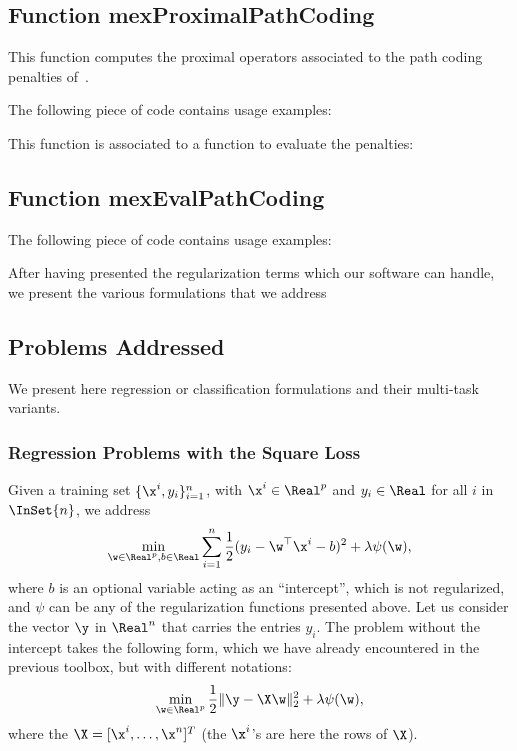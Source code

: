 \documentclass[a4paper, 11pt]{article}
\begin{document}
\subsection{Function mexProximalPathCoding}
This function computes the proximal operators associated to the path coding penalties of~\cite{mairal14}. 

The following piece of code contains usage examples:

This function is associated to a function to evaluate the penalties:
\subsection{Function mexEvalPathCoding}

The following piece of code contains usage examples:



After having presented the regularization terms which our software can handle,
we present the various formulations that we address
\subsection{Problems Addressed}
We present here regression or classification formulations and their multi-task variants.
\subsubsection{Regression Problems with the Square Loss}  %
Given a training set $\{\x^i,y_i\}_{i=1}^n$, with $\x^i \in \Real^p$ and $y_i \in \Real$ for all $i$ in $\InSet{n}$, we address
\begin{displaymath}
\min_{\w \in \Real^p, b \in \Real} \sum_{i=1}^n \frac{1}{2}(y_i-\w^\top\x^i-b)^2 + \lambda\psi(\w),
\end{displaymath}
where $b$ is an optional variable acting as an ``intercept'', which is not regularized, and $\psi$
can be any of the regularization functions presented above. 
Let us consider the vector $\y$ in $\Real^n$ that carries the entries $y_i$. 
The problem without the intercept takes the following form, which we have already
encountered in the previous toolbox, but with different notations:
\begin{displaymath}
\min_{\w \in \Real^p} \frac{1}{2}\|\y-\X\w\|_2^2 + \lambda\psi(\w),
   \end{displaymath}
   where the $\X=[\x^i,\ldots,\x^n]^T$ (the $\x^i$'s are here the rows of $\X$).
\end{document}

